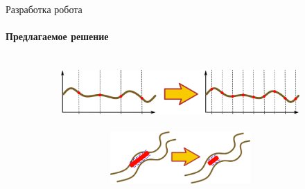 \documentclass[aspectratio=169,xcolor=table,10pt]{beamer}
\begin{document}
\begin{frame}[t]{Разработка робота}
    \framesubtitle{Предлагаемое решение}
    \begin{columns}[T,onlytextwidth]
        \begin{column}{0.48\textwidth}
            \vspace{-0.8cm}
            \begin{figure}[H]
                \begin{subfigure}{0.99\textwidth}
                    \centering\includegraphics[height=2cm,width=1\textwidth,keepaspectratio]{f1.png}
                    \label{fig:f1.png}
                \end{subfigure}

                \begin{subfigure}{0.99\textwidth}
                    \centering\includegraphics[height=2cm,width=1\textwidth,keepaspectratio]{f2.png}
                    \label{fig:f2.png}
                \end{subfigure}


\end{figure}
\end{column}
\end{columns}
\end{frame}
\end{document}
